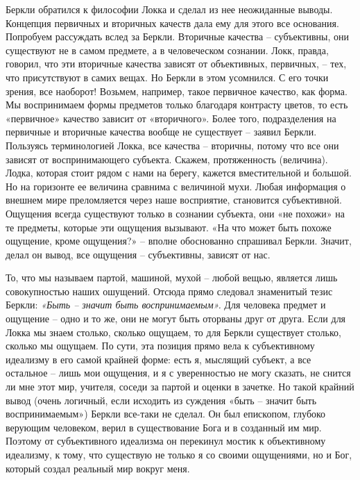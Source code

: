 \documentclass[a4paper, 14pt]{extreport}
\begin{document}
Беркли обратился к философии Локка и сделал из нее неожиданные выводы.
Концепция первичных и вторичных качеств дала ему для этого все
основания. Попробуем рассуждать вслед за Беркли. Вторичные качества --
субъективны, они существуют не в самом предмете, а в человеческом
сознании. Локк, правда, говорил, что эти вторичные качества зависят от
объективных, первичных, -- тех, что присутствуют в самих вещах. Но
Беркли в этом усомнился. С его точки зрения, все наоборот! Возьмем,
например, такое первичное качество, как форма. Мы воспринимаем формы
предметов только благодаря контрасту цветов, то есть «первичное»
качество зависит от «вторичного». Более того, подразделения на первичные
и вторичные качества вообще не существует -- заявил Беркли. Пользуясь
терминологией Локка, все качества -- вторичны, потому что все они
зависят от воспринимающего субъекта. Скажем, протяженность (величина).
Лодка, которая стоит рядом с нами на берегу, кажется вместительной и
большой. Но на горизонте ее величина сравнима с величиной мухи. Любая
информация о внешнем мире преломляется через наше восприятие, становится
субъективной. Ощущения всегда существуют только в сознании субъекта, они
«не похожи» на те предметы, которые эти ощущения вызывают. «На что может
быть похоже ощущение, кроме ощущения?» -- вполне обоснованно спрашивал
Беркли. Значит, делал он вывод, все ощущения -- субъективны, зависят от
нас.

То, что мы называем партой, машиной, мухой -- любой вещью, является лишь
совокупностью наших ошущений. Отсюда прямо следовал знаменитый тезис
Беркли: \emph{«Быть -- значит быть воспринимаемым».} Для человека
предмет и ощущение -- одно и то же, они не могут быть оторваны друг от
друга. Если для Локка мы знаем столько, сколько ощущаем, то для Беркли
существует столько, сколько мы ощущаем. По сути, эта позиция прямо вела
к субъективному идеализму в его самой крайней форме: есть я, мыслящий
субъект, а все остальное -- лишь мои ощущения, и я с уверенностью не
могу сказать, не снится ли мне этот мир, учителя, соседи за партой и
оценки в зачетке. Но такой крайний вывод (очень логичный, если исходить
из суждения «быть -- значит быть воспринимаемым») Беркли все-таки не
сделал. Он был епископом, глубоко верующим человеком, верил в
существование Бога и в созданный им мир. Поэтому от субъективного
идеализма он перекинул мостик к объективному идеализму, к тому, что
существую не только я со своими ощущениями, но и Бог, который создал
реальный мир вокруг меня.
\end{document}
